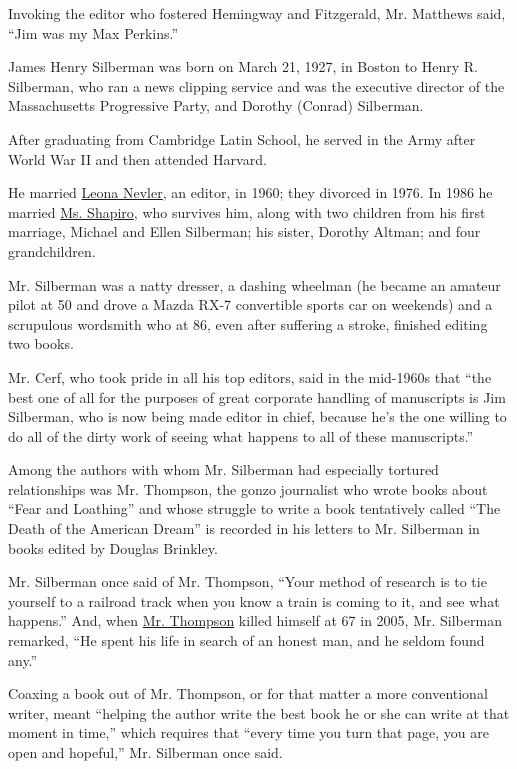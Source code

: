 Invoking the editor who fostered Hemingway and Fitzgerald, Mr. Matthews
said, ``Jim was my Max Perkins.''

James Henry Silberman was born on March 21, 1927, in Boston to Henry R.
Silberman, who ran a news clipping service and was the executive
director of the Massachusetts Progressive Party, and Dorothy (Conrad)
Silberman.

After graduating from Cambridge Latin School, he served in the Army
after World War II and then attended Harvard.

He married
\href{https://www.nytimes.com/2005/12/15/arts/leona-nevler-editor-dies-at-79-shepherded-peyton-place.html}{Leona
Nevler}, an editor, in 1960; they divorced in 1976. In 1986 he married
\href{https://www.nytimes.com/1986/08/27/style/selma-shapiro-wed-to-james-silberman.html}{Ms.
Shapiro}, who survives him, along with two children from his first
marriage, Michael and Ellen Silberman; his sister, Dorothy Altman; and
four grandchildren.

Mr. Silberman was a natty dresser, a dashing wheelman (he became an
amateur pilot at 50 and drove a Mazda RX-7 convertible sports car on
weekends) and a scrupulous wordsmith who at 86, even after suffering a
stroke, finished editing two books.

Mr. Cerf, who took pride in all his top editors, said in the mid-1960s
that ``the best one of all for the purposes of great corporate handling
of manuscripts is Jim Silberman, who is now being made editor in chief,
because he's the one willing to do all of the dirty work of seeing what
happens to all of these manuscripts.''

Among the authors with whom Mr. Silberman had especially tortured
relationships was Mr. Thompson, the gonzo journalist who wrote books
about ``Fear and Loathing'' and whose struggle to write a book
tentatively called ``The Death of the American Dream'' is recorded in
his letters to Mr. Silberman in books edited by Douglas Brinkley.

Mr. Silberman once said of Mr. Thompson, ``Your method of research is to
tie yourself to a railroad track when you know a train is coming to it,
and see what happens.'' And, when
\href{https://www.nytimes.com/2005/02/21/books/hunter-s-thompson-67-author-commits-suicide.html}{Mr.
Thompson} killed himself at 67 in 2005, Mr. Silberman remarked, ``He
spent his life in search of an honest man, and he seldom found any.''

Coaxing a book out of Mr. Thompson, or for that matter a more
conventional writer, meant ``helping the author write the best book he
or she can write at that moment in time,'' which requires that ``every
time you turn that page, you are open and hopeful,'' Mr. Silberman once
said.

